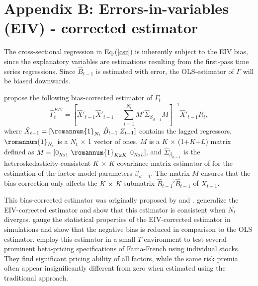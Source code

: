 \newpage 
\section*{Appendix B: Errors-in-variables (EIV) - corrected estimator}
The cross-sectional regression in Eq.(\ref{csr}) is inherently subject to the EIV bias, since the explanatory variables are estimations resulting from the first-pass time series regressions. Since $\hat{B}_{t-1}$ is estimated with error, the OLS-estimator of $\Gamma$ will be biased downwards. 
\par \citet{chordia2015cross} propose the following bias-corrected estimator of $\Gamma_t$ 
\begin{equation}
\label{shanken}
    \hat{\Gamma}^{EIV}_t = \left[\hat{X}'_{t-1}\hat{X}'_{t-1} - \sum^{N_t}_{i=1}M'\hat{\Sigma}_{\beta_{it-1}}M\right]^{-1}\hat{X}'_{t-1}R_t,
\end{equation}
where $\hat{X}_{t-1} = [\romannum{1}_{N_t} \hspace{0.1cm}\hat{B}_{t-1} \hspace{0.1cm} Z_{t-1}]$ contains the lagged regressors, $\romannum{1}_{N_t}$ is a $N_t$ $\times$ 1 vector of ones, $M$ is a $K$ $\times$ (1+$K$+$L$) matrix defined as $M$ = [$0_{K\text{x}1}$ $\romannum{1}_{K\text{x}K}$ $0_{K\text{x}L}$], and $\hat{
\Sigma}_{\beta_{it-1}}$ is the heteroskedasticity-consistent $K$ $\times$ $K$ covariance matrix estimator of \citet{white1980heteroskedasticity} for the estimation of the factor model parameters $\beta_{it-1}$. The matrix $M$ ensures that the bias-correction only affects the $K$ $\times$ $K$ submatrix $\hat{B}_{t-1}'\hat{B}_{t-1}$ of $X_{t-1}$. 
\par This bias-corrected estimator was originally proposed by \citet{theil1971principles} and \citet{litzenberger1979effect}. 
\citet{shanken1992estimation} generalize the EIV-corrected estimator and show that this estimator is consistent when $N_t$ diverges. \citet{chordia2015cross} gauge the statistical properties of the EIV-corrected estimator in simulations and show that the negative bias is reduced in comparison to the OLS estimator. \citet{raponi2017testing} employ this estimator in a small $T$ environment to test several prominent beta-pricing specifications of Fama-French using individual stocks. They find significant pricing ability of all factors, while the same risk premia often appear insignificantly different from zero when estimated using the traditional approach.  
